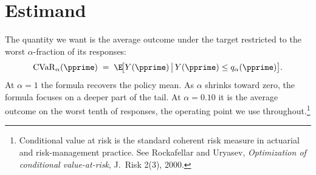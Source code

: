 \documentclass[11pt]{article}
\newcommand{\CVaR}{\mathrm{CVaR}}
\begin{document}
\section{Estimand}

The quantity we want is the average outcome under the target restricted to the worst $\alpha$-fraction of its responses:
\begin{equation}\label{eq:cvar-def}
\CVaR_\alpha(\pprime) \;=\; \E\!\big[Y(\pprime) \,\big|\, Y(\pprime) \le q_\alpha(\pprime)\big].
\end{equation}
At $\alpha = 1$ the formula recovers the policy mean. As $\alpha$ shrinks toward zero, the formula focuses on a deeper part of the tail. At $\alpha = 0.10$ it is the average outcome on the worst tenth of responses, the operating point we use throughout.\footnote{Conditional value at risk is the standard coherent risk measure in actuarial and risk-management practice. See Rockafellar and Uryasev, \emph{Optimization of conditional value-at-risk}, J.\ Risk 2(3), 2000.}
\end{document}
